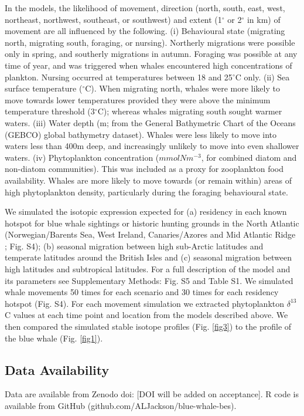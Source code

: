 \documentclass[a4paper,12pt]{article}
\begin{document}
In the models, the likelihood of movement, direction (north, south, east, west, northeast, northwest, southeast, or southwest) and extent (1$^{\circ}$ or 2$^{\circ}$ in km) of movement are all influenced by the following. 
(i) Behavioural state (migrating north, migrating south, foraging, or nursing). %
Northerly migrations were possible only in spring, and southerly migrations in autumn. 
Foraging was possible at any time of year, and was triggered when whales encountered high concentrations of plankton. Nursing occurred at temperatures between 18 and 25$^{\circ}$C only. 
(ii) Sea surface temperature\cite{yool2013medusa} ($^{\circ}$C). 
When migrating north, whales were more likely to move towards lower temperatures provided they were above the minimum temperature threshold (3$^{\circ}$C); whereas whales migrating south sought warmer waters. 
(iii) Water depth (m; from the General Bathymetric Chart of the Oceans (GEBCO) global bathymetry dataset). 
Whales were less likely to move into waters less than 400m deep, and increasingly unlikely to move into even shallower waters. 
(iv) Phytoplankton concentration ($mmolNm^{-3}$, for combined diatom and non-diatom communities\cite{yool2013medusa}). 
This was included as a proxy for zooplankton food availability. 
Whales are more likely to move towards (or remain within) areas of high phytoplankton density, particularly during the foraging behavioural state. 
 
We simulated the isotopic expression expected for (a) residency in each known hotspot for blue whale sightings or historic hunting grounds in the North Atlantic (Norwegian/Barents Sea, West Ireland, Canaries/Azores and Mid Atlantic Ridge\cite{mcdonald2006biogeographic,reilly2008balaenoptera,sigurjonsson1995life} ; Fig. S4); (b) seasonal migration between high sub-Arctic latitudes and temperate latitudes around the British Isles and (c) seasonal migration between high latitudes and subtropical latitudes. 
For a full description of the model and its parameters see Supplementary Methods: Fig. S5 and Table S1. 
We simulated whale movements 50 times for each scenario and 30 times for each residency hotspot (Fig. S4). 
For each movement simulation we extracted phytoplankton $\delta^{13}$C values at each time point and location from the models described above\cite{magozzi2017using}. 
We then compared the simulated stable isotope profiles (Fig. \ref{fig3}) to the profile of the blue whale (Fig. \ref{fig1}).
 
\subsection{Data Availability}
Data are available from Zenodo doi: [DOI will be added on acceptance]. 
R code is available from GitHub (github.com/ALJackson/blue-whale-bes).
\end{document}

